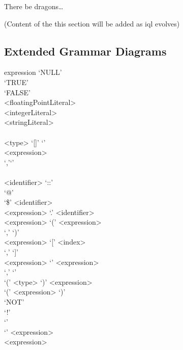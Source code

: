 \documentclass[11pt,a4paper]{report}
\begin{document}
There be dragons\dots

(Content of the this section will be added as \ac{iql} evolves)



\begin{appendices}
\chapter{Extended Grammar Diagrams}


\begin{samepage}
\begin{gram*}
	\label{gram:expression}
	\begin{rrdiag*}{expression}
		\sst
		`NULL' \\
		`TRUE' \\
		`FALSE' \\
		<floatingPointLiteral> \\
		<integerLiteral> \\
		<stringLiteral> \\
		\sst \\ <type> `[]' \est `{' \sst \\ \srp <expression> \\ `,'\erp \est `}' \\
		\sst \\ <identifier> `::' \\ `@' \\ `\$' \est <identifier> \\
		<expression> `.' <identifier> \\ %
		<expression> `(' \srp <expression> \\ `,' \erp `)' \\ %
		<expression> `[' \srp <index> \\ `,' \erp `]' \\ %
		<expression> `{' \srp <expression> \\  `,' \erp `}' \\ %
		`(' <type> `)' <expression> \\ %
		`(' <expression> `)' \\ %
		\sst `NOT' \\ `!' \\ `\textminus' \\ `\texttildelow' \est <expression> \\ %
		<expression> \sst 
		 \\ 

\end{rrdiag*}
\end{gram*}
\end{samepage}
\end{appendices}
\end{document}
